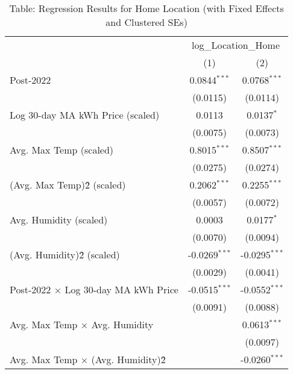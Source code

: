 
\begin{table}[htbp]
   \caption{Table: Regression Results for Home Location (with Fixed Effects and Clustered SEs)}
   \bigskip
   \centering
   \begin{tabular}{lcc}
      \toprule
       & \multicolumn{2}{c}{log\_Location\_Home}\\
                                                & (1)             & (2)\\  
      \midrule 
      Post-2022                                 & 0.0844$^{***}$  & 0.0768$^{***}$\\   
                                                & (0.0115)        & (0.0114)\\   
      Log 30-day MA kWh Price (scaled)          & 0.0113          & 0.0137$^{*}$\\   
                                                & (0.0075)        & (0.0073)\\   
      Avg. Max Temp (scaled)                    & 0.8015$^{***}$  & 0.8507$^{***}$\\   
                                                & (0.0275)        & (0.0274)\\   
      (Avg. Max Temp)\^2 (scaled)               & 0.2062$^{***}$  & 0.2255$^{***}$\\   
                                                & (0.0057)        & (0.0072)\\   
      Avg. Humidity (scaled)                    & 0.0003          & 0.0177$^{*}$\\   
                                                & (0.0070)        & (0.0094)\\   
      (Avg. Humidity)\^2 (scaled)               & -0.0269$^{***}$ & -0.0295$^{***}$\\   
                                                & (0.0029)        & (0.0041)\\   
      Post-2022 × Log 30-day MA kWh Price       & -0.0515$^{***}$ & -0.0552$^{***}$\\   
                                                & (0.0091)        & (0.0088)\\   
      Avg. Max Temp × Avg. Humidity             &                 & 0.0613$^{***}$\\   
                                                &                 & (0.0097)\\   
      Avg. Max Temp × (Avg. Humidity)\^2        &                 & -0.0260$^{***}$\\   

\end{tabular}
\end{table}
